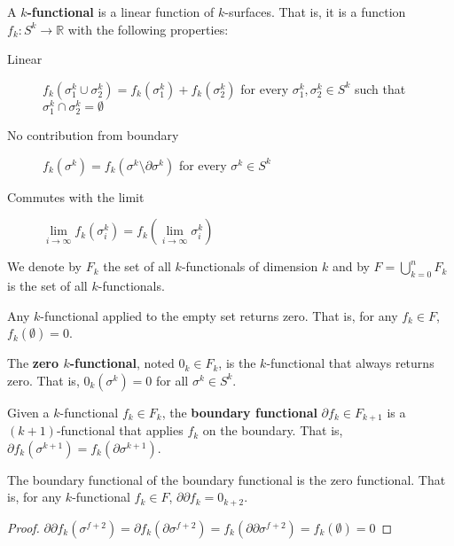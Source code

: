 \documentclass[11pt,letterpaper,fleqn]{memoir}
\begin{document}
\begin{defn}
	A \textbf{$k$-functional} is a linear function of $k$-surfaces. That is, it is a function $f_k : S^k \to \mathbb{R}$ with the following properties:
	\begin{description}
		\item[Linear] $f_k(\sigma^k_1 \cup \sigma^k_2) = f_k(\sigma^k_1) + f_k(\sigma^k_2)$ for every $\sigma^k_1, \sigma^k_2 \in S^k$ such that $\sigma^k_1 \cap \sigma^k_2 = \emptyset$
		\item[No contribution from boundary] $f_k(\sigma^k) = f_k(\sigma^k \setminus \partial \sigma^k)$ for every $\sigma^k \in S^k$
		\item[Commutes with the limit] $\lim\limits_{i \to \infty} f_k(\sigma_i^k) = f_k(\lim\limits_{i \to \infty}\sigma_i^k)$
	\end{description}
	We denote by $F_k$ the set of all $k$-functionals of dimension $k$ and by $F = \bigcup_{k=0}^nF_k$ is the set of all $k$-functionals.
\end{defn}

\begin{coro}
	Any $k$-functional applied to the empty set returns zero. That is, for any $f_k \in F$, $f_k(\emptyset) = 0$.
\end{coro}

\begin{defn}
	The \textbf{zero $k$-functional}, noted $0_k \in F_k$, is the $k$-functional that always returns zero. That is, $0_k(\sigma^k) = 0$ for all $\sigma^k \in S^k$.
\end{defn}


\begin{defn}
	Given a $k$-functional $f_k \in F_k$, the \textbf{boundary functional} $\partial f_k \in F_{k+1}$ is a $(k+1)$-functional that applies $f_k$ on the boundary. That is, $\partial f_k(\sigma^{k+1}) = f_k(\partial \sigma^{k+1})$. 
\end{defn}

\begin{coro}
	The boundary functional of the boundary functional is the zero functional. That is, for any $k$-functional $f_k \in F$, $\partial \partial f_k = 0_{k+2}$.
\end{coro}

\begin{proof}
	$\partial \partial f_k (\sigma ^{f+2}) = \partial f_k (\partial \sigma ^{f+2}) = f_k (\partial \partial \sigma ^{f+2}) = f_k(\emptyset) = 0$
\end{proof}
\end{document}
